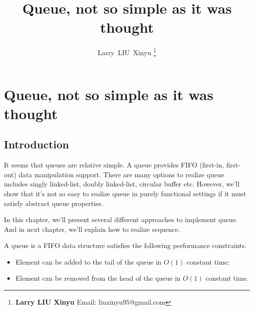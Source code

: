 \documentclass{article}
\begin{document}


\title{Queue, not so simple as it was thought}

\author{Larry~LIU~Xinyu
\thanks{{\bfseries Larry LIU Xinyu } \newline
  Email: liuxinyu95@gmail.com \newline}
  }

\maketitle
\fi


\ifx\wholebook\relax
\chapter{Queue, not so simple as it was thought}
\fi

\section{Introduction}
\label{introduction}
It seems that queues are relative simple. A queue provides FIFO (first-in,
first-out) data manipulation support. There are many options to
realize queue includes singly linked-list, doubly linked-list,
circular buffer etc. However, we'll show that it's not so easy to
realize queue in purely functional settings if it must satisfy
abstract queue properties.

In this chapter, we'll present several different approaches to
implement queue. And in next chapter, we'll explain how to realize
sequence.

A queue is a FIFO data structure satisfies the following performance
constraints.

\begin{itemize}
\item Element can be added to the tail of the queue in $O(1)$ constant time;
\item Element can be removed from the head of the queue in $O(1)$ constant time.
\end{itemize}
\end{document}
